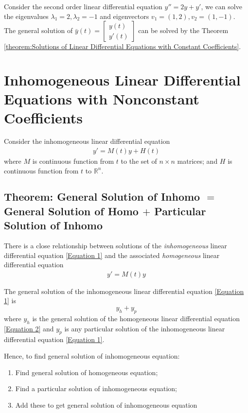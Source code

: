 \documentclass[11pt]{elegantbook}
\begin{document}
\begin{example}
    Consider the second order linear differential equation $y''=2y+y'$, we can solve the eigenvalues $\lambda_1=2,\lambda_2=-1$ and eigenvectors $v_1=(1,2), v_2=(1,-1)$. The general solution of $\bar{y}(t)=\begin{bmatrix}
        y(t)\\ y'(t)
    \end{bmatrix}$ can be solved by the Theorem \ref{theorem:Solutions of Linear Differential Equations with Constant Coefficients}.
\end{example}

\section{Inhomogeneous Linear Differential Equations with Nonconstant Coefficients}
Consider the inhomogeneous linear differential equation
\begin{equation}
    \begin{aligned}
        y'=M(t)y+H(t)
    \end{aligned}
    \tag{1}
    \label{Equation 1}
\end{equation}
where $M$ is continuous function from $t$ to the set of $n \times n$ matrices; and $H$ is continuous
function from $t$ to $\mathbb{R}^n$.

\subsection{Theorem: General Solution of Inhomo $=$ General Solution of Homo $+$ Particular Solution of Inhomo}
There is a close relationship between solutions of the \textit{inhomogeneous} linear differential equation \ref{Equation 1} and the associated \textit{homogeneous} linear differential equation
\begin{equation}
    \begin{aligned}
        y'=M(t)y
    \end{aligned}
    \tag{2}
    \label{Equation 2}
\end{equation}

\begin{theorem}[General Solution of Inhomo$=$General Solution of Homo$+$Particular Solution of Inhomo]
    The general solution of the inhomogeneous linear differential equation \ref{Equation 1} is $$y_h+y_p$$
    where $y_h$ is the general solution of the homogeneous linear differential equation \ref{Equation 2} and $y_p$ is any particular solution of the inhomogeneous linear differential equation \ref{Equation 1}.
\end{theorem}
Hence, to find general solution of inhomogeneous equation:
\begin{enumerate}
    \item Find general solution of homogeneous equation;
    \item Find a particular solution of inhomogeneous equation;
    \item Add these to get general solution of inhomogeneous equation
\end{enumerate}
\end{document}
